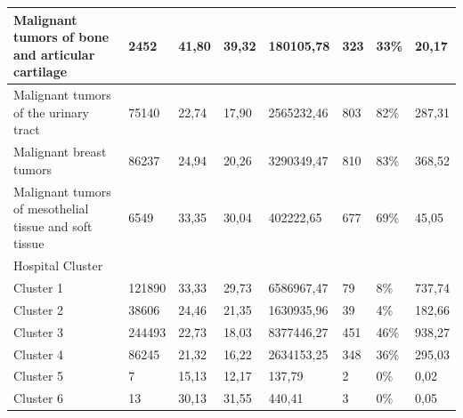 \begin{table}[h]
{\begin{tabular}{|l|l|l|l|l|l|l|l|}
            Malignant tumors of bone and articular cartilage                                 & 2452    & 41,80           & 39,32           & 180105,78      & 323      & 33\%      & 20,17              \\ \hline
            Malignant tumors of the urinary tract                                            & 75140   & 22,74           & 17,90           & 2565232,46     & 803      & 82\%      & 287,31             \\ \hline
            Malignant breast tumors                                                          & 86237   & 24,94           & 20,26           & 3290349,47     & 810      & 83\%      & 368,52             \\ \hline
            Malignant tumors of mesothelial tissue and soft tissue                           & 6549    & 33,35           & 30,04           & 402222,65      & 677      & 69\%      & 45,05              \\ \hline
            Hospital Cluster                                                                 & ~       & ~               & ~               & ~              & ~        & ~         & ~                  \\ \hline
            Cluster 1                                                                        & 121890  & 33,33           & 29,73           & 6586967,47     & 79       & 8\%       & 737,74             \\ \hline
            Cluster 2                                                                        & 38606   & 24,46           & 21,35           & 1630935,96     & 39       & 4\%       & 182,66             \\ \hline
            Cluster 3                                                                        & 244493  & 22,73           & 18,03           & 8377446,27     & 451      & 46\%      & 938,27             \\ \hline
            Cluster 4                                                                        & 86245   & 21,32           & 16,22           & 2634153,25     & 348      & 36\%      & 295,03             \\ \hline
            Cluster 5                                                                        & 7       & 15,13           & 12,17           & 137,79         & 2        & 0\%       & 0,02               \\ \hline
            Cluster 6                                                                        & 13      & 30,13           & 31,55           & 440,41         & 3        & 0\%       & 0,05               \\ \hline

\end{tabular}}
\end{table}

